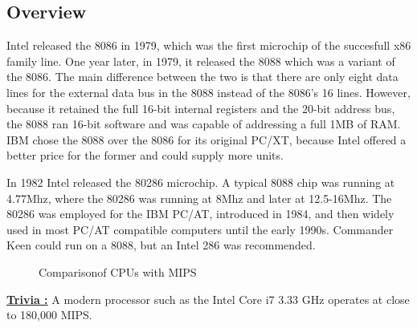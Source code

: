 \documentclass[book.tex]{subfiles}
\begin{document}
\subsection{Overview}
  Intel released the 8086 in 1979, which was the first microchip of the succesfull x86 family line. One year later, in 1979, it released the 8088 which was a variant of the 8086. The main difference between the two is that there are only eight data lines for the external data bus in the 8088 instead of the 8086's 16 lines.  However, because it retained the full 16-bit internal registers and the 20-bit address bus, the 8088 ran 16-bit software and was capable of addressing a full 1MB of RAM. IBM chose the 8088 over the 8086 for its original PC/XT, because Intel offered a better price for the former and could supply more units. \\
  \par
  In 1982 Intel released the 80286 microchip. A typical 8088 chip was running at 4.77Mhz, where the 80286 was running at 8Mhz and later at 12.5-16Mhz. The 80286 was employed for the IBM PC/AT, introduced in 1984, and then widely used in most PC/AT compatible computers until the early 1990s. Commander Keen could run on a 8088, but an Intel 286 was recommended.\\   

\par


\begin{figure}[H]
\centering
   \caption{Comparison\protect\footnotemark of CPUs with MIPS}
 \end{figure}
 \par
 \par
  \textbf{\underline{Trivia :}} A modern processor such as the Intel Core i7 3.33 GHz operates at close to 180,000 MIPS.\\
  \par
\end{document}
